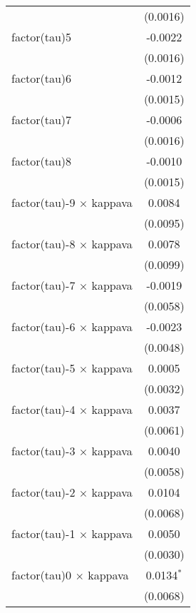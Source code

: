 \begin{tabular}{lc}
                                   & (0.0016)\\   
   factor(tau)5                    & -0.0022\\   
                                   & (0.0016)\\   
   factor(tau)6                    & -0.0012\\   
                                   & (0.0015)\\   
   factor(tau)7                    & -0.0006\\   
                                   & (0.0016)\\   
   factor(tau)8                    & -0.0010\\   
                                   & (0.0015)\\   
   factor(tau)-9 $\times$ kappava  & 0.0084\\   
                                   & (0.0095)\\   
   factor(tau)-8 $\times$ kappava  & 0.0078\\   
                                   & (0.0099)\\   
   factor(tau)-7 $\times$ kappava  & -0.0019\\   
                                   & (0.0058)\\   
   factor(tau)-6 $\times$ kappava  & -0.0023\\   
                                   & (0.0048)\\   
   factor(tau)-5 $\times$ kappava  & 0.0005\\   
                                   & (0.0032)\\   
   factor(tau)-4 $\times$ kappava  & 0.0037\\   
                                   & (0.0061)\\   
   factor(tau)-3 $\times$ kappava  & 0.0040\\   
                                   & (0.0058)\\   
   factor(tau)-2 $\times$ kappava  & 0.0104\\   
                                   & (0.0068)\\   
   factor(tau)-1 $\times$ kappava  & 0.0050\\   
                                   & (0.0030)\\   
   factor(tau)0 $\times$ kappava   & 0.0134$^{*}$\\   
                                   & (0.0068)\\   

\end{tabular}
